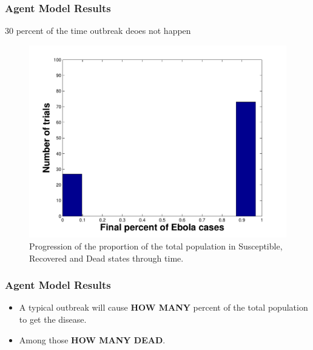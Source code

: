\documentclass[30pt]{beamer}
\begin{document}
\begin{frame}
\frametitle{Agent Model Results}
30 percent of the time outbreak deoes not happen

\begin{figure}
  \includegraphics[scale=0.35]{N1000Hist-eps-converted-to} \caption{Progression of the proportion of the total population in Susceptible, Recovered and Dead states through time.}
\end{figure}
\end{frame}


\begin{frame}
\frametitle{Agent Model Results}
\begin{itemize}
\item A typical outbreak will cause \textbf{HOW MANY} percent of the total population to get the disease.
\item Among those \textbf{HOW MANY DEAD}.
\end{itemize}

\begin{figure}
\end{figure}
\end{frame}
\end{document}
